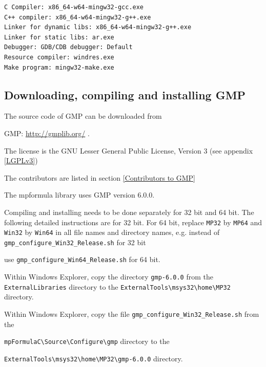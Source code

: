 \begin{verbatim}
C Compiler: x86_64-w64-mingw32-gcc.exe
C++ compiler: x86_64-w64-mingw32-g++.exe
Linker for dynamic libs: x86_64-w64-mingw32-g++.exe
Linker for static libs: ar.exe
Debugger: GDB/CDB debugger: Default
Resource compiler: windres.exe
Make program: mingw32-make.exe
\end{verbatim}




\newpage
\subsection{Downloading, compiling and installing GMP}
The source code of GMP can be downloaded from

GMP: \href{http://gmplib.org/}{http://gmplib.org/} . 

The license is the GNU Lesser General Public License, Version 3 (see appendix \ref{LGPLv3})

The contributors are listed in section \ref{Contributors to GMP}

The mpformula library uses GMP version 6.0.0.

\vpara
Compiling and installing needs to be done separately for 32 bit and 64 bit. The following detailed instructions are for 32 bit. For 64 bit, replace \verb|MP32| by \verb|MP64| and \verb|Win32| by  \verb|Win64| in all file names and directory names, e.g. instead of \verb|gmp_configure_Win32_Release.sh| for 32 bit

use \verb|gmp_configure_Win64_Release.sh| for 64 bit.

\vpara
Within Windows Explorer, copy the directory \verb|gmp-6.0.0|  from the \verb|ExternalLibraries|
directory to the \verb|ExternalTools\msys32\home\MP32| directory. 

\vpara
Within Windows Explorer, copy the file \verb|gmp_configure_Win32_Release.sh|  from the

\verb|mpFormulaC\Source\Configure\gmp| directory to the 
 
\verb|ExternalTools\msys32\home\MP32\gmp-6.0.0| directory.  


